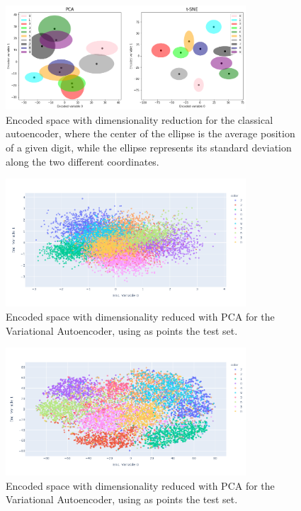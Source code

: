 \begin{figure}[h]
    \centering
    \includegraphics[width=0.8\textwidth]{Images/autoenc.png}
    \caption{Encoded space with dimensionality reduction for the classical autoencoder, where the center of the ellipse is the average position of a given digit, 
    while the ellipse represents its standard deviation along the two different coordinates.}
    \label{fig:dim_red_aut}
\end{figure}

\begin{figure}[h]
    \centering
    \includegraphics[width=0.8\textwidth]{Images/VAE_PCA.png}
    \caption{Encoded space with dimensionality reduced with PCA for the Variational Autoencoder, using as points the test set.}
    \label{fig:vae_PCA}
\end{figure}

\begin{figure}[h]
    \centering
    \includegraphics[width=0.8\textwidth]{Images/VAE_tsne.png}
    \caption{Encoded space with dimensionality reduced with PCA for the Variational Autoencoder, using as points the test set.}
    \label{fig:vae_TSNE}
\end{figure}

